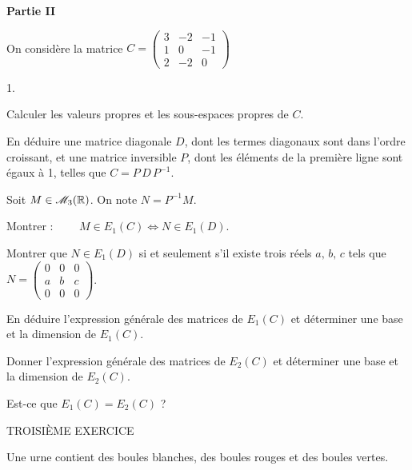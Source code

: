 \documentclass[11pt]{article}%
\begin{document}
\begin{center}
\textbf{Partie II}
\end{center}

On considère la matrice $C = \left( 
\begin{array}{rrr}
3 & -2 & -1 \\
1 & 0 & -1 \\
2 & -2 & 0
\end{array}
\right) $

\begin{noliste}{1.}
 \setlength{\itemsep}{4mm}
\item Calculer les valeurs propres et les sous-espaces propres de $C$.

\item En déduire une matrice diagonale $D$, dont les termes diagonaux
sont dans l'ordre croissant, et une matrice inversible $P$, dont les
éléments de la première ligne sont égaux à 1, telles que $C =
P\,D\,P^{-1}$.

\item Soit $M\in \mathscr{M}_{3}(\mathbb{R}) $. On note $N = P^{-1}M. $

Montrer : $\qquad M\in E_{1}\left( C\right) \Longleftrightarrow N\in
E_{1}\left( D\right) $.

\item Montrer que $N\in E_{1}\left( D\right) $ si et seulement s'il
existe
trois réels $a,\,b,\,c$ tels que $N = \left( 
\begin{array}{rrr}
0 & 0 & 0 \\
a & b & c \\
0 & 0 & 0
\end{array}
\right) $.

\item En déduire l'expression générale des matrices de $E_{1}\left(
C\right) $ et déterminer une base et la dimension de $E_{1}\left(
C\right) $.

\item Donner l'expression générale des matrices de $E_{2}\left(
C\right) $ et déterminer une base et la dimension de $E_{2}\left(
C\right) $.

Est-ce que $E_{1}\left( C\right) = E_{2}\left( C\right) $ ?
\end{noliste}

\begin{center}
{\LARGE TROISI\`{E}ME EXERCICE}
\end{center}

Une urne contient des boules blanches, des boules rouges et des boules
vertes.
\end{document}

